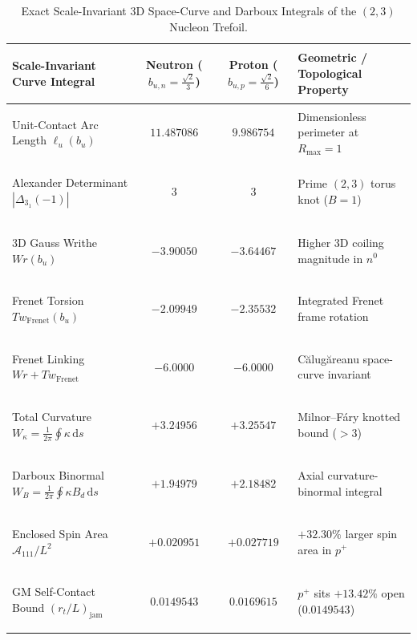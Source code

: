 \documentclass[11pt, a4paper]{article}
\DeclareRobustCommand{\dd}{\mathrm{d}}
\DeclareRobustCommand{\Rmax}{R_{\max}}
\begin{document}
\begin{table}[!htbp]
\centering
\caption{Exact Scale-Invariant 3D Space-Curve and Darboux Integrals of the $(2,3)$ Nucleon Trefoil.}
\label{tab:topological_darboux}
\footnotesize
\setlength{\tabcolsep}{5pt}
\renewcommand{\arraystretch}{1.16}
\begin{tabularx}{\textwidth}{>{\bfseries\raggedright\arraybackslash}p{} c c >{\raggedright\arraybackslash}X}
\toprule
Scale-Invariant Curve Integral & Neutron ($b_{u,n} = \frac{\sqrt{2}}{3}$) & Proton ($b_{u,p} = \frac{\sqrt{2}}{6}$) & Geometric / Topological Property \\
\midrule
Unit-Contact Arc Length $\ell_u(b_u)$ & $11.487086$ & $9.986754$ & Dimensionless perimeter at $\Rmax = 1$ \\
Alexander Determinant $|\Delta_{3_1}(-1)|$ & $3$ & $3$ & Prime $(2,3)$ torus knot ($B = 1$) \\
3D Gauss Writhe $Wr(b_u)$ & $-3.90050$ & $-3.64467$ & Higher 3D coiling magnitude in $n^0$ \\
Frenet Torsion $Tw_{\mathrm{Frenet}}(b_u)$ & $-2.09949$ & $-2.35532$ & Integrated Frenet frame rotation \\
Frenet Linking $Wr + Tw_{\mathrm{Frenet}}$ & $\mathbf{-6.0000}$ & $\mathbf{-6.0000}$ & C\u{a}lug\u{a}reanu space-curve invariant \\
Total Curvature $W_\kappa = \frac{1}{2\pi}\oint\kappa\,\dd s$ & $+3.24956$ & $+3.25547$ & Milnor--F\'{a}ry knotted bound ($> 3$) \\
Darboux Binormal $W_B = \frac{1}{2\pi}\oint\kappa B_d\,\dd s$ & $+1.94979$ & $+2.18482$ & Axial curvature-binormal integral \\
Enclosed Spin Area $\mathcal{A}_{111}/L^2$ & $+0.020951$ & $+0.027719$ & $+32.30\%$ larger spin area in $p^+$ \\
GM Self-Contact Bound $(r_t/L)_{\mathrm{jam}}$ & $0.0149543$ & $0.0169615$ & $p^+$ sits $+13.42\%$ open ($0.0149543$) \\
\bottomrule
\end{tabularx}
\end{table}
\end{document}
